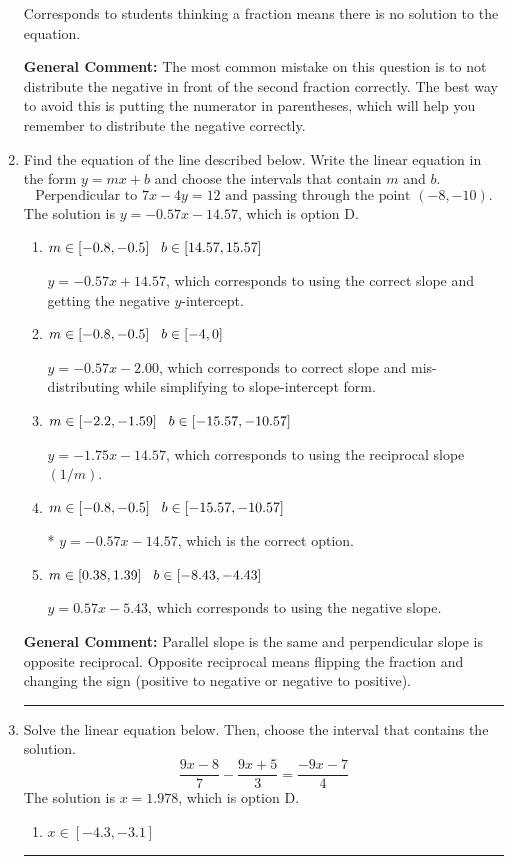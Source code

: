 \documentclass{extbook}[14pt]
\newcommand{\litem}[1]{\item #1

\rule{\textwidth}{0.4pt}}
\begin{document}
\begin{enumerate}
{\begin{enumerate}[label=\Alph*.]
Corresponds to students thinking a fraction means there is no solution to the equation.
\end{enumerate}

\textbf{General Comment:} The most common mistake on this question is to not distribute the negative in front of the second fraction correctly. The best way to avoid this is putting the numerator in parentheses, which will help you remember to distribute the negative correctly.
}
\litem{
Find the equation of the line described below. Write the linear equation in the form $ y=mx+b $ and choose the intervals that contain $m$ and $b$.
\[ \text{Perpendicular to } 7 x - 4 y = 12 \text{ and passing through the point } (-8, -10). \]The solution is \( y = -0.57x - 14.57 \), which is option D.\begin{enumerate}[label=\Alph*.]
\item \( m \in [-0.8, -0.5] \hspace*{3mm} b \in [14.57, 15.57] \)

 $y = -0.57x + 14.57$, which corresponds to using the correct slope and getting the negative $y$-intercept.
\item \( m \in [-0.8, -0.5] \hspace*{3mm} b \in [-4, 0] \)

 $y = -0.57x - 2.00$, which corresponds to correct slope and mis-distributing while simplifying to slope-intercept form.
\item \( m \in [-2.2, -1.59] \hspace*{3mm} b \in [-15.57, -10.57] \)

 $y = -1.75x - 14.57$, which corresponds to using the reciprocal slope $(1/m)$.
\item \( m \in [-0.8, -0.5] \hspace*{3mm} b \in [-15.57, -10.57] \)

* $y = -0.57x - 14.57$, which is the correct option.
\item \( m \in [0.38, 1.39] \hspace*{3mm} b \in [-8.43, -4.43] \)

 $y = 0.57x - 5.43$, which corresponds to using the negative slope.
\end{enumerate}

\textbf{General Comment:} Parallel slope is the same and perpendicular slope is opposite reciprocal. Opposite reciprocal means flipping the fraction and changing the sign (positive to negative or negative to positive).
}
\litem{
Solve the linear equation below. Then, choose the interval that contains the solution.
\[ \frac{9x -8}{7} - \frac{9x + 5}{3} = \frac{-9x -7}{4} \]The solution is \( x = 1.978 \), which is option D.\begin{enumerate}[label=\Alph*.]
\item \( x \in [-4.3, -3.1] \)


\end{enumerate}}
\end{enumerate}
\end{document}
